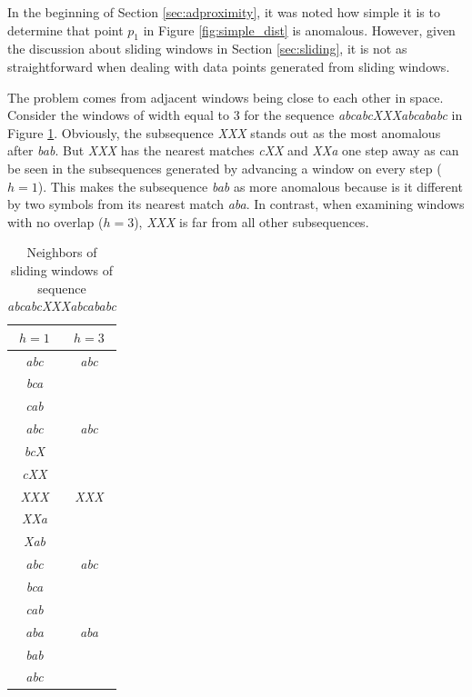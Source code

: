 In the beginning of Section \ref{sec:adproximity}, it was noted how simple it is to determine that point $p_1$ in Figure \ref{fig:simple_dist} is anomalous. However, given the discussion about sliding windows in Section \ref{sec:sliding}, it is not as straightforward when dealing with data points generated from sliding windows.

The problem comes from adjacent windows being close to each other in space. Consider the windows of width equal to 3 for the sequence \emph{abcabcXXXabcababc} \cite{Keogh2005} in Figure \ref{tbl:selfmatch}. Obviously, the subsequence \emph{XXX} stands out as the most anomalous after \emph{bab}. But \emph{XXX} has the nearest matches \emph{cXX} and \emph{XXa} one step away as can be seen in the subsequences generated by advancing a window on every step ($h=1$). This makes the subsequence \emph{bab} as more anomalous because is it different by two symbols from its nearest match \emph{aba}. In contrast, when examining windows with no overlap ($h=3$), \emph{XXX} is far from all other subsequences.

\begin{table}[h]
  \centering
  \begin{tabular}{|c||c|}
    \hline
    $h=1$ & $h=3$ \\
    \hline
    \hline
    \emph{abc} & \emph{abc} \\
    \emph{bca} & \\
    \emph{cab} & \\
    \hline
    \emph{abc} & \emph{abc} \\
    \emph{bcX} & \\
    \emph{cXX} & \\
    \hline
    \emph{XXX} & \emph{XXX} \\
    \emph{XXa} & \\
    \emph{Xab} & \\
    \hline
    \emph{abc} & \emph{abc} \\
    \emph{bca} & \\
    \emph{cab} & \\
    \hline
    \emph{aba} & \emph{aba} \\ 
    \emph{bab} & \\
    \emph{abc} & \\
    \hline
  \end{tabular}
  \caption[Neighbors of sliding windows]{Neighbors of sliding windows of sequence \emph{abcabcXXXabcababc}}
  \label{tbl:selfmatch}
\end{table}

